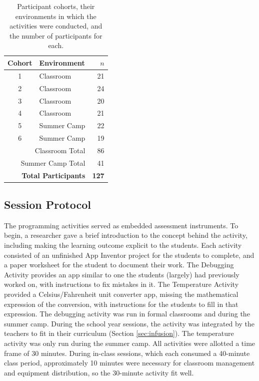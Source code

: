 \begin{table}
\begin{centering}
	\begin{tabular}{clr}
	Cohort & Environment & $n$ \\
	\hline
	1 & Classroom & 21		\\
	2 & Classroom & 24		\\
	3 & Classroom & 20		\\
	4 & Classroom & 21		\\
	5 & Summer Camp & 22	\\
	6 & Summer Camp & 19	\\ \hline
	\multicolumn{2}{r}{Classroom Total} & 86 \\
	\multicolumn{2}{r}{Summer Camp Total} & 41 \\ \hline \hline
	\multicolumn{2}{r}{\textbf{Total Participants}} & \textbf{127} \\ 
	
	\end{tabular}
	\caption[Participant cohorts]{Participant cohorts, their environments in which the activities were conducted, and the number of participants for each.}
	\label{tab:cohorts}
\end{centering}
\end{table}


\subsection{Session Protocol}
The programming activities served as embedded assessment instruments. To begin, a researcher gave a brief introduction to the concept behind the activity, including making the learning outcome explicit to the students. Each activity consisted of an unfinished App Inventor project for the students to complete, and a paper worksheet for the student to document their work. The Debugging Activity provides an app similar to one the students (largely) had previously worked on, with instructions to fix mistakes in it. The Temperature Activity provided a Celsius/Fahrenheit unit converter app, missing the mathematical expression of the conversion, with instructions for the students to fill in that expression. The debugging activity was run in formal classrooms and during the summer camp. During the school year sessions, the activity was integrated by the teachers to fit in their curriculum (Section \ref{sec:infusion}). The temperature activity was only run during the summer camp. All activities were allotted a time frame of 30 minutes. During in-class sessions, which each consumed a 40-minute class period, approximately 10 minutes were necessary for classroom management and equipment distribution, so the 30-minute activity fit well. 

